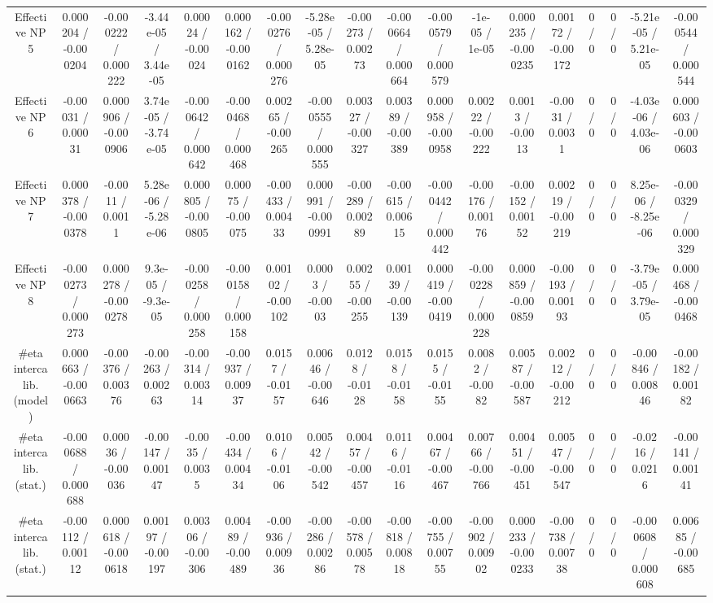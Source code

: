 \documentclass[10pt]{article}
\begin{document}
\begin{table}[htbp]
\begin{center}
\begin{tabular}{|c|c|c|c|c|c|c|c|c|c|c|c|c|c|c|c|c|c|}
  Effective NP 5 & 0.000204 / -0.000204 & -0.000222 / 0.000222 & -3.44e-05 / 3.44e-05 & 0.00024 / -0.00024 & 0.000162 / -0.000162 & -0.000276 / 0.000276 & -5.28e-05 / 5.28e-05 & -0.00273 / 0.00273 & -0.000664 / 0.000664 & -0.000579 / 0.000579 & -1e-05 / 1e-05 & 0.000235 / -0.000235 & 0.00172 / -0.00172 & 0 / 0 & 0 / 0 & -5.21e-05 / 5.21e-05 & -0.000544 / 0.000544 \\ 
  Effective NP 6 & -0.00031 / 0.00031 & 0.000906 / -0.000906 & 3.74e-05 / -3.74e-05 & -0.000642 / 0.000642 & -0.000468 / 0.000468 & 0.00265 / -0.00265 & -0.000555 / 0.000555 & 0.00327 / -0.00327 & 0.00389 / -0.00389 & 0.000958 / -0.000958 & 0.00222 / -0.00222 & 0.0013 / -0.0013 & -0.0031 / 0.0031 & 0 / 0 & 0 / 0 & -4.03e-06 / 4.03e-06 & 0.000603 / -0.000603 \\ 
  Effective NP 7 & 0.000378 / -0.000378 & -0.0011 / 0.0011 & 5.28e-06 / -5.28e-06 & 0.000805 / -0.000805 & 0.00075 / -0.00075 & -0.00433 / 0.00433 & 0.000991 / -0.000991 & -0.00289 / 0.00289 & -0.00615 / 0.00615 & -0.000442 / 0.000442 & -0.00176 / 0.00176 & -0.00152 / 0.00152 & 0.00219 / -0.00219 & 0 / 0 & 0 / 0 & 8.25e-06 / -8.25e-06 & -0.000329 / 0.000329 \\ 
  Effective NP 8 & -0.000273 / 0.000273 & 0.000278 / -0.000278 & 9.3e-05 / -9.3e-05 & -0.000258 / 0.000258 & -0.000158 / 0.000158 & 0.00102 / -0.00102 & 0.0003 / -0.0003 & 0.00255 / -0.00255 & 0.00139 / -0.00139 & 0.000419 / -0.000419 & -0.000228 / 0.000228 & 0.000859 / -0.000859 & -0.00193 / 0.00193 & 0 / 0 & 0 / 0 & -3.79e-05 / 3.79e-05 & 0.000468 / -0.000468 \\ 
  #eta intercalib. (model) & 0.000663 / -0.000663 & -0.00376 / 0.00376 & -0.00263 / 0.00263 & -0.00314 / 0.00314 & -0.00937 / 0.00937 & 0.0157 / -0.0157 & 0.00646 / -0.00646 & 0.0128 / -0.0128 & 0.0158 / -0.0158 & 0.0155 / -0.0155 & 0.0082 / -0.0082 & 0.00587 / -0.00587 & 0.00212 / -0.00212 & 0 / 0 & 0 / 0 & -0.00846 / 0.00846 & -0.00182 / 0.00182 \\ 
  #eta intercalib. (stat.) & -0.000688 / 0.000688 & 0.00036 / -0.00036 & -0.00147 / 0.00147 & -0.0035 / 0.0035 & -0.00434 / 0.00434 & 0.0106 / -0.0106 & 0.00542 / -0.00542 & 0.00457 / -0.00457 & 0.0116 / -0.0116 & 0.00467 / -0.00467 & 0.00766 / -0.00766 & 0.00451 / -0.00451 & 0.00547 / -0.00547 & 0 / 0 & 0 / 0 & -0.0216 / 0.0216 & -0.00141 / 0.00141 \\ 
  #eta intercalib. (stat.) & -0.00112 / 0.00112 & 0.000618 / -0.000618 & 0.00197 / -0.00197 & 0.00306 / -0.00306 & 0.00489 / -0.00489 & -0.00936 / 0.00936 & -0.00286 / 0.00286 & -0.00578 / 0.00578 & -0.00818 / 0.00818 & -0.00755 / 0.00755 & -0.00902 / 0.00902 & 0.000233 / -0.000233 & -0.00738 / 0.00738 & 0 / 0 & 0 / 0 & -0.000608 / 0.000608 & 0.00685 / -0.00685 \\ 

\end{tabular}
\end{center}
\end{table}
\end{document}
